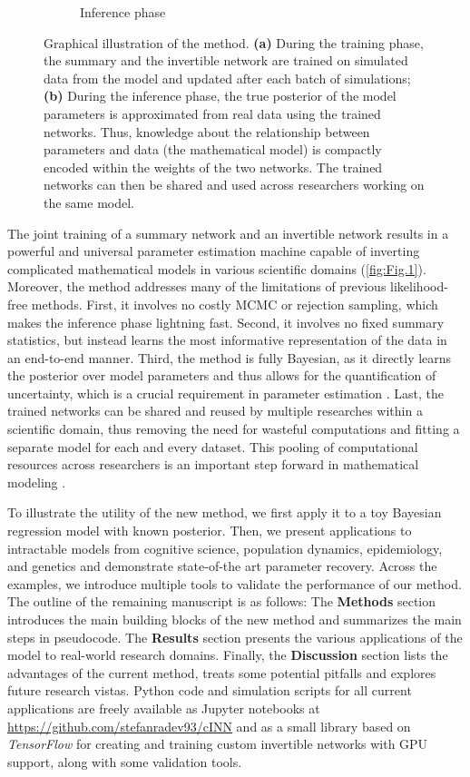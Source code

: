 \documentclass[9pt,twoside,lineno]{pnas-new}
\begin{document}
\begin{figure}
\begin{subfigure}[b]{0.49\textwidth}
    \caption{Inference phase}
    \label{fig:Fig.1b}
  \end{subfigure}
      \caption{Graphical illustration of the method. \textbf{(a)} During the training phase, the summary and the invertible network are trained on simulated data from the model and updated after each batch of simulations; \textbf{(b)} During the inference phase, the true posterior of the model parameters is approximated from real data using the trained networks. Thus, knowledge about the relationship between parameters and data (the mathematical model) is compactly encoded within the weights of the two networks. The trained networks can then be shared and used across researchers working on the same model.} \label{fig:Fig.1}
\end{figure}

The joint training of a summary network and an invertible network results in a powerful and universal parameter estimation machine capable of inverting complicated mathematical models in various scientific domains (\autoref{fig:Fig.1}). Moreover, the method addresses many of the limitations of previous likelihood-free methods. First, it involves no costly MCMC or rejection sampling, which makes the inference phase lightning fast. Second, it involves no fixed summary statistics, but instead learns the most informative representation of the data in an end-to-end manner. Third, the method is fully Bayesian, as it directly learns the posterior over model parameters and thus allows for the quantification of uncertainty, which is a crucial requirement in parameter estimation \cite{kendall2017uncertainties, gelman2013bayesian}. Last, the trained networks can be shared and reused by multiple researches within a scientific domain, thus removing the need for wasteful computations and fitting a separate model for each and every dataset. This pooling of computational resources across researchers is an important step forward in mathematical modeling \cite{mestdagh2018prepaid}.

To illustrate the utility of the new method, we first apply it to a toy Bayesian regression model with known posterior. Then, we present applications to intractable models from cognitive science, population dynamics, epidemiology, and genetics and demonstrate state-of-the art parameter recovery. Across the examples, we introduce multiple tools to validate the performance of our method. The outline of the remaining manuscript is as follows: The \textbf{Methods} section introduces the main building blocks of the new method and summarizes the main steps in pseudocode. The \textbf{Results} section presents the various applications of the model to real-world research domains. Finally, the \textbf{Discussion} section lists the advantages of the current method, treats some potential pitfalls and explores future research vistas. Python code and simulation scripts for all current applications are freely available as Jupyter notebooks at \href{https://github.com/stefanradev93/cINN}{https://github.com/stefanradev93/cINN} and as a small library based on \textit{TensorFlow} \cite{abadi2016tensorflow} for creating and training custom invertible networks with GPU support, along with some validation tools. 
\end{document}
